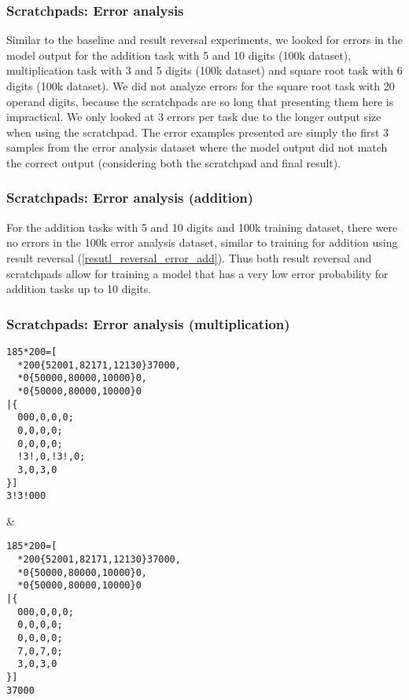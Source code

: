 \subsubsection{Scratchpads: Error analysis}

Similar to the baseline and result reversal experiments, we looked for errors in the model output for the addition task with 5 and 10 digits (100k dataset), multiplication task with 3 and 5 digits (100k dataset) and square root task with 6 digits (100k dataset).
We did not analyze errors for the square root task with 20 operand digits, because the scratchpads are so long that presenting them here is impractical.
We only looked at 3 errors per task due to the longer output size when using the scratchpad. The error examples presented are simply the first 3 samples from the error analysis dataset where the model output did not match the correct output (considering both the scratchpad and final result).

\subsubsection{Scratchpads: Error analysis (addition)}

For the addition tasks with 5 and 10 digits and 100k training dataset, there were no errors in the 100k error analysis dataset, similar to training for addition using result reversal (\cref{resutl_reversal_error_add}).
Thus both result reversal and scratchpads allow for training a model that has a very low error probability for addition tasks up to 10 digits.

\subsubsection{Scratchpads: Error analysis (multiplication)}


\ErrorAnalysisTableBegin

\begin{lstlisting}
185*200=[
  *200{52001,82171,12130}37000,
  *0{50000,80000,10000}0,
  *0{50000,80000,10000}0
|{
  000,0,0,0;
  0,0,0,0;
  0,0,0,0;
  !3!,0,!3!,0;
  3,0,3,0
}]
3!3!000
\end{lstlisting} &
\begin{lstlisting}
185*200=[
  *200{52001,82171,12130}37000,
  *0{50000,80000,10000}0,
  *0{50000,80000,10000}0
|{
  000,0,0,0;
  0,0,0,0;
  0,0,0,0;
  7,0,7,0;
  3,0,3,0
}]
37000
\end{lstlisting} \\ \ErrorAnalysisTableRule

